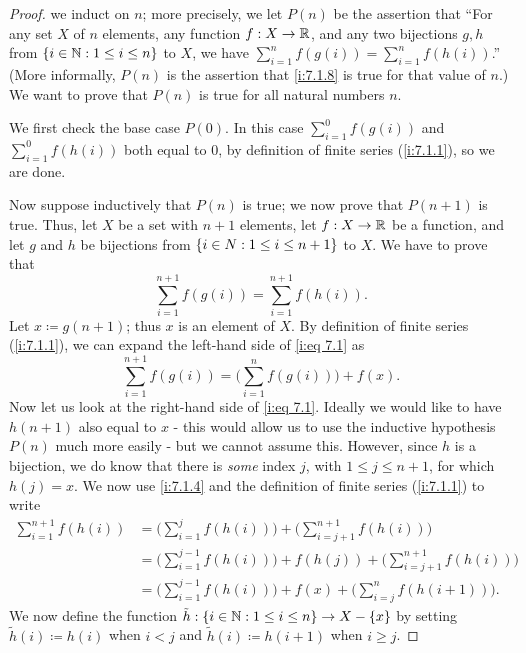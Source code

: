 \begin{proof}
  we induct on \(n\);
  more precisely, we let \(P(n)\) be the assertion that ``For any set \(X\) of \(n\) elements, any function \(f : X \to \mathbb{R}\), and any two bijections \(g, h\) from \(\left\lbrace i \in \mathbb{N} : 1 \leq i \leq n\right\rbrace\) to \(X\), we have \(\sum_{i = 1}^n f(g(i)) = \sum_{i = 1}^n f(h(i))\).''
  (More informally, \(P(n)\) is the assertion that \cref{i:7.1.8} is true for that value of \(n\).)
  We want to prove that \(P(n)\) is true for all natural numbers \(n\).

  We first check the base case \(P(0)\).
  In this case \(\sum_{i = 1}^0 f(g(i))\) and \(\sum_{i = 1}^0 f(h(i))\) both equal to \(0\), by definition of finite series (\cref{i:7.1.1}), so we are done.

  Now suppose inductively that \(P(n)\) is true;
  we now prove that \(P(n + 1)\) is true.
  Thus, let \(X\) be a set with \(n + 1\) elements, let \(f : X \to \mathbb{R}\) be a function, and let \(g\) and \(h\) be bijections from \(\left\lbrace i \in N : 1 \leq i \leq n + 1\right\rbrace\) to \(X\).
  We have to prove that
  \[
    \sum_{i = 1}^{n + 1} f(g(i)) = \sum_{i = 1}^{n + 1} f(h(i)). \tag{i:7.1}\label{i:eq 7.1}
  \]
  Let \(x \coloneqq g(n + 1)\);
  thus \(x\) is an element of \(X\).
  By definition of finite series (\cref{i:7.1.1}), we can expand the left-hand side of \cref{i:eq 7.1} as
  \[
    \sum_{i = 1}^{n + 1} f(g(i)) = \Bigg(\sum_{i = 1}^n f(g(i))\Bigg) + f(x).
  \]
  Now let us look at the right-hand side of \cref{i:eq 7.1}.
  Ideally we would like to have \(h(n + 1)\) also equal to \(x\)
  - this would allow us to use the inductive hypothesis \(P(n)\) much more easily
  - but we cannot assume this.
  However, since \(h\) is a bijection, we do know that there is \emph{some} index \(j\), with \(1 \leq j \leq n + 1\), for which \(h(j) = x\).
  We now use \cref{i:7.1.4} and the definition of finite series (\cref{i:7.1.1}) to write
  \begin{align*}
    \sum_{i = 1}^{n + 1} f(h(i)) & = \Bigg(\sum_{i = 1}^j f(h(i))\Bigg) + \Bigg(\sum_{i = j + 1}^{n + 1} f(h(i))\Bigg)                 \\
                                 & = \Bigg(\sum_{i = 1}^{j - 1} f(h(i))\Bigg) + f(h(j)) + \Bigg(\sum_{i = j + 1}^{n + 1} f(h(i))\Bigg) \\
                                 & = \Bigg(\sum_{i = 1}^{j - 1} f(h(i))\Bigg) + f(x) + \Bigg(\sum_{i = j}^n f(h(i + 1))\Bigg).
  \end{align*}
  We now define the function \(\tilde{h} : \left\lbrace i \in \mathbb{N} : 1 \leq i \leq n\right\rbrace \to X - \left\lbrace x\right\rbrace\) by setting \(\tilde{h}(i) \coloneqq h(i)\) when \(i < j\) and \(\tilde{h}(i) \coloneqq h(i + 1)\) when \(i \geq j\).

\end{proof}
